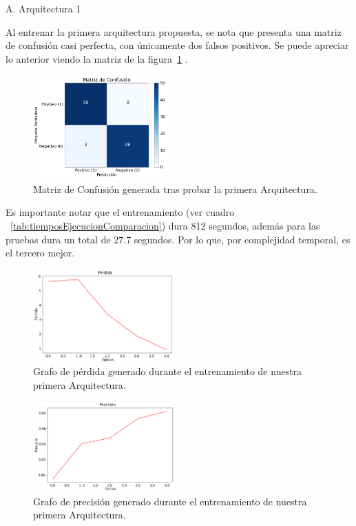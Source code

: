 \documentclass[conference, spanish, english]{IEEEtran}
\begin{document}
\begin{center}
    A. Arquitectura 1
\end{center}
Al entrenar la primera arquitectura propuesta, se nota que presenta una matriz de confusión casi perfecta, con únicamente dos falsos positivos. Se puede apreciar lo anterior viendo la matriz de la figura~\ref{fig:MatrizArqui1} .


\begin{figure}[H]
\centering
\includegraphics[width=0.48\textwidth]{training_plots/plot_architecture_2/confusion_matrix.png}
\caption{Matriz de Confusión generada tras probar la primera Arquitectura.}
\label{fig:MatrizArqui1}
\end{figure}


Es importante notar que el entrenamiento (ver cuadro ~\ref{tab:tiemposEjecucionComparacion}) dura 812 segundos, además para las pruebas dura un total de 27.7 segundos. Por lo que, por complejidad temporal, es el tercero mejor.

\begin{figure}[H]
\centering
\includegraphics[width=0.48\textwidth]{training_plots/plot_architecture_2/loss_plot.png}
\caption{Grafo de pérdida generado durante el entrenamiento de nuestra primera Arquitectura.}
\label{fig:perdidaArqui1}
\end{figure}


\begin{figure}[H]
\centering
\includegraphics[width=0.48\textwidth]{training_plots/plot_architecture_2/precision_plot.png}
\caption{Grafo de precisión generado durante el entrenamiento de nuestra primera Arquitectura.}
\label{fig:precisionArqui1}
\end{figure}
\end{document}
